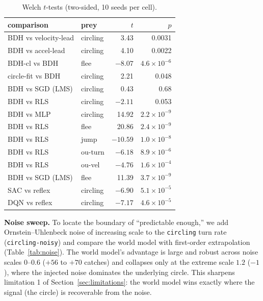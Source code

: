 \documentclass[11pt]{article}
\begin{document}
\begin{table}[t]
\centering
\caption{Welch $t$-tests (two-sided, 10 seeds per cell).}
\label{tab:sig}
\small
\begin{tabular}{llrr}
\toprule
comparison & prey & $t$ & $p$ \\
\midrule
BDH vs velocity-lead & circling & 3.43 & 0.0031 \\
BDH vs accel-lead & circling & 4.10 & 0.0022 \\
BDH-cl vs BDH & flee & $-8.07$ & $4.6\times 10^{-6}$ \\
circle-fit vs BDH & circling & 2.21 & 0.048 \\
BDH vs SGD (LMS) & circling & 0.43 & 0.68 \\
BDH vs RLS & circling & $-2.11$ & 0.053 \\
BDH vs MLP & circling & 14.92 & $2.2\times 10^{-9}$ \\
BDH vs RLS & flee & 20.86 & $2.4\times 10^{-9}$ \\
BDH vs RLS & jump & $-10.59$ & $1.0\times 10^{-8}$ \\
BDH vs RLS & ou-turn & $-6.18$ & $8.9\times 10^{-6}$ \\
BDH vs RLS & ou-vel & $-4.76$ & $1.6\times 10^{-4}$ \\
BDH vs SGD (LMS) & flee & 11.39 & $3.7\times 10^{-9}$ \\
SAC vs reflex & circling & $-6.90$ & $5.1\times 10^{-5}$ \\
DQN vs reflex & circling & $-7.17$ & $4.6\times 10^{-5}$ \\
\bottomrule
\end{tabular}
\end{table}

\textbf{Noise sweep.} To locate the boundary of ``predictable enough,'' we add
Ornstein--Uhlenbeck noise of increasing scale to the \texttt{circling} turn rate
(\texttt{circling-noisy}) and compare the world model with first-order extrapolation
(Table~\ref{tab:noise}). The world model's advantage is large and robust across noise scales
$0$--$0.6$ ($+56$ to $+70$ catches) and collapses only at the extreme scale $1.2$ ($-1$), where
the injected noise dominates the underlying circle. This sharpens limitation 1 of
Section~\ref{sec:limitations}: the world model wins exactly where the signal (the circle) is
recoverable from the noise.
\end{document}
